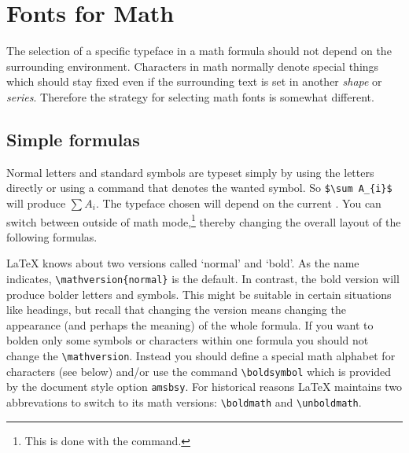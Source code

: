  \section{Fonts for Math}
 
 The selection of a specific typeface in a math formula should not
 depend on the surrounding
 environment.  Characters in math normally denote special
               things which should stay fixed even if the surrounding
               text is set in another {\em shape\/} or {\em series}.
 Therefore the strategy for selecting math fonts is somewhat
 different.
 
 \subsection{Simple formulas}
 
 Normal letters and standard symbols are typeset simply by using the
 letters directly or using a command that denotes the wanted symbol. So
 \verb+$\sum A_{i}$+ will produce $\sum A_{i}$. The typeface chosen
 will depend on the current . You can switch
 between  outside of math mode,\footnote{This is done
 with the command\hfil{}.}  thereby changing the overall layout of the
 following formulas.
 
%
%
 
 \LaTeX{} knows about two versions called `normal' and `bold'. As the
 name indicates, \verb+\mathversion{normal}+ is the default. In contrast,
 the bold version will produce bolder letters and symbols.  This might
 be suitable in certain situations like headings,
 but recall that changing the
 version means changing the appearance (and perhaps the meaning)
 of the whole formula.
 If you want to bolden only some symbols or characters within
 one formula you should not change the \verb=\mathversion=.
 Instead you should
 define a special math alphabet for characters
 (see below) and/or use the command \verb=\boldsymbol= which is
 provided by the document style option {\tt amsbsy}.
 For historical reasons \LaTeX{} maintains two abbrevations to switch
 to its math versions: \verb+\boldmath+ and \verb+\unboldmath+.
 
